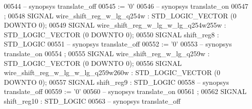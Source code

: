 \begin{DoxyCode}
{00544 \textcolor{keyword}{     -- synopsys translate\_off}
00545       \textcolor{vhdlchar}{:=} \textcolor{vhdlchar}{'}\textcolor{vhdllogic}{}\textcolor{vhdllogic}{0}\textcolor{vhdlchar}{'}
00546 \textcolor{keyword}{     -- synopsys translate\_on}
00547      ;
00548      \textcolor{keywordflow}{SIGNAL}  \textcolor{vhdlchar}{wire_shift_reg_w_lg_q254w}  \textcolor{vhdlchar}{:}   \textcolor{comment}{STD\_LOGIC\_VECTOR} \textcolor{vhdlchar}{(}\textcolor{vhdllogic}{}\textcolor{vhdllogic}{0} \textcolor{keywordflow}{DOWNTO} \textcolor{vhdllogic}{}\textcolor{vhdllogic}{0}\textcolor{vhdlchar}{)};
00549      \textcolor{keywordflow}{SIGNAL}  \textcolor{vhdlchar}{wire_shift_reg_w_lg_w_lg_q254w255w} \textcolor{vhdlchar}{:}   \textcolor{comment}{STD\_LOGIC\_VECTOR} \textcolor{vhdlchar}{(}\textcolor{vhdllogic}{}\textcolor{vhdllogic}{0} \textcolor{keywordflow}{DOWNTO} \textcolor{vhdllogic}{}\textcolor{vhdllogic}{0}\textcolor{vhdlchar}{)};
00550      \textcolor{keywordflow}{SIGNAL}  \textcolor{vhdlchar}{shift_reg8} \textcolor{vhdlchar}{:}   \textcolor{comment}{STD\_LOGIC}
00551 \textcolor{keyword}{     -- synopsys translate\_off}
00552       \textcolor{vhdlchar}{:=} \textcolor{vhdlchar}{'}\textcolor{vhdllogic}{}\textcolor{vhdllogic}{0}\textcolor{vhdlchar}{'}
00553 \textcolor{keyword}{     -- synopsys translate\_on}
00554      ;
00555      \textcolor{keywordflow}{SIGNAL}  \textcolor{vhdlchar}{wire_shift_reg_w_lg_q259w}  \textcolor{vhdlchar}{:}   \textcolor{comment}{STD\_LOGIC\_VECTOR} \textcolor{vhdlchar}{(}\textcolor{vhdllogic}{}\textcolor{vhdllogic}{0} \textcolor{keywordflow}{DOWNTO} \textcolor{vhdllogic}{}\textcolor{vhdllogic}{0}\textcolor{vhdlchar}{)};
00556      \textcolor{keywordflow}{SIGNAL}  \textcolor{vhdlchar}{wire_shift_reg_w_lg_w_lg_q259w260w} \textcolor{vhdlchar}{:}   \textcolor{comment}{STD\_LOGIC\_VECTOR} \textcolor{vhdlchar}{(}\textcolor{vhdllogic}{}\textcolor{vhdllogic}{0} \textcolor{keywordflow}{DOWNTO} \textcolor{vhdllogic}{}\textcolor{vhdllogic}{0}\textcolor{vhdlchar}{)};
00557      \textcolor{keywordflow}{SIGNAL}  \textcolor{vhdlchar}{shift_reg9} \textcolor{vhdlchar}{:}   \textcolor{comment}{STD\_LOGIC}
00558 \textcolor{keyword}{     -- synopsys translate\_off}
00559       \textcolor{vhdlchar}{:=} \textcolor{vhdlchar}{'}\textcolor{vhdllogic}{}\textcolor{vhdllogic}{0}\textcolor{vhdlchar}{'}
00560 \textcolor{keyword}{     -- synopsys translate\_on}
00561      ;
00562      \textcolor{keywordflow}{SIGNAL}  \textcolor{vhdlchar}{shift_reg10}    \textcolor{vhdlchar}{:}   \textcolor{comment}{STD\_LOGIC}
00563 \textcolor{keyword}{     -- synopsys translate\_off}
}
\end{DoxyCode}
